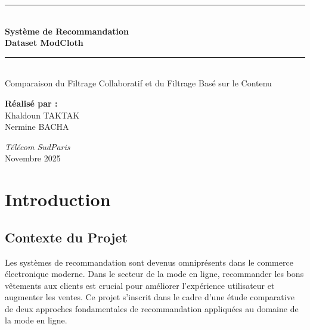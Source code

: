 \documentclass[12pt,a4paper]{article}
\begin{document}
\begin{titlepage}
    \centering
    \vspace*{1cm}
    
    {\color{tspblue}\rule{\linewidth}{2pt}}\\[0.5cm]
    {\Huge\bfseries\color{tspblue} Système de Recommandation}\\[0.3cm]
    {\huge\bfseries\color{tspblue} Dataset ModCloth}\\[0.5cm]
    {\color{tspblue}\rule{\linewidth}{2pt}}\\[1.5cm]
    
    {\Large\color{tspgray} Comparaison du Filtrage Collaboratif et du Filtrage Basé sur le Contenu}\\[2cm]
    
    \begin{tcolorbox}[colback=lightgray, colframe=tspblue, width=0.8\textwidth, arc=3mm, boxrule=1pt]
        \centering
        {\large\textbf{Réalisé par :}}\\[0.5cm]
        {\Large Khaldoun TAKTAK}\\[0.2cm]
        {\Large Nermine BACHA}\\[0.5cm]
    \end{tcolorbox}
    
    \vfill
    
    {\large\textit{Télécom SudParis}}\\[0.2cm]
    
    {\large Novembre 2025}
    
\end{titlepage}
\thispagestyle{empty}

\newpage
\tableofcontents
\newpage

\section{Introduction}

\subsection{Contexte du Projet}

Les systèmes de recommandation sont devenus omniprésents dans le commerce électronique moderne. Dans le secteur de la mode en ligne, recommander les bons vêtements aux clients est crucial pour améliorer l'expérience utilisateur et augmenter les ventes. Ce projet s'inscrit dans le cadre d'une étude comparative de deux approches fondamentales de recommandation appliquées au domaine de la mode en ligne.
\end{document}
